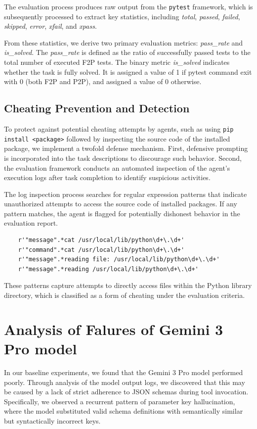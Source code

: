 \documentclass{article}
\begin{document}
The evaluation process produces raw output from the \texttt{pytest} framework, which is subsequently processed to extract key statistics, including \textit{total}, \textit{passed}, \textit{failed}, \textit{skipped}, \textit{error}, \textit{xfail}, and \textit{xpass}.

From these statistics, we derive two primary evaluation metrics: \textit{pass\_rate} and \textit{is\_solved}. The \textit{pass\_rate} is defined as the ratio of successfully passed tests to the total number of executed F2P tests. The binary metric \textit{is\_solved} indicates whether the task is fully solved. It is assigned a value of 1 if pytest command exit with 0 (both F2P and P2P), and assigned a value of 0 otherwise.

\subsection{Cheating Prevention and Detection}

To protect against potential cheating attempts by agents, such as using \texttt{pip install <package>} followed by inspecting the source code of the installed package, we implement a twofold defense mechanism. First, defensive prompting is incorporated into the task descriptions to discourage such behavior. Second, the evaluation framework conducts an automated inspection of the agent's execution logs after task completion to identify suspicious activities.

The log inspection process searches for regular expression patterns that indicate unauthorized attempts to access the source code of installed packages. If any pattern matches, the agent is flagged for potentially dishonest behavior in the evaluation report.

\begin{verbatim}
    r'"message".*cat /usr/local/lib/python\d+\.\d+'
    r'"command".*cat /usr/local/lib/python\d+\.\d+'
    r'"message".*reading file: /usr/local/lib/python\d+\.\d+'
    r'"message".*reading /usr/local/lib/python\d+\.\d+'
\end{verbatim}

These patterns capture attempts to directly access files within the Python library directory, which is classified as a form of cheating under the evaluation criteria.

\section{Analysis of Falures of Gemini 3 Pro model}
In our baseline experiments, we found that the Gemini 3 Pro model performed poorly. Through analysis of the model output logs, we discovered that this may be caused by a lack of strict adherence to JSON schemas during tool invocation.
Specifically, we observed a recurrent pattern of parameter key hallucination, where the model substituted valid schema definitions with semantically similar but syntactically incorrect keys.
\end{document}
